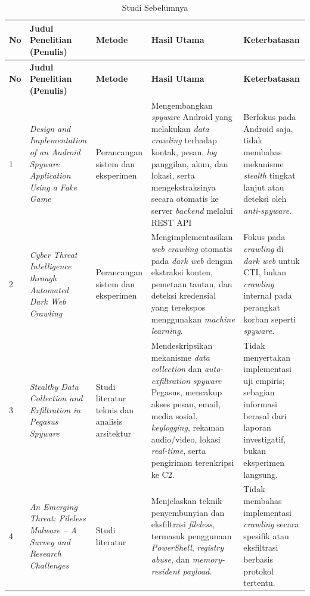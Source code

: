 \captionsetup{justification=raggedright,singlelinecheck=false}
\begin{longtable}{|p{0.5cm}|p{3cm}|p{2.3cm}|p{3.6cm}|p{3.6cm}|}
\caption{Studi Sebelumnya}
\label{tbl:studi-sebelumnya} \\
\hline
\textbf{No} &
\textbf{Judul Penelitian (Penulis)} &
\textbf{Metode} &
\textbf{Hasil Utama} &
\textbf{Keterbatasan} \\
\hline
\endfirsthead

\hline
\textbf{No} &
\textbf{Judul Penelitian (Penulis)} &
\textbf{Metode} &
\textbf{Hasil Utama} &
\textbf{Keterbatasan} \\
\hline
\endhead

\hline
\endfoot

1 &
\textit{Design and Implementation of an Android Spyware Application Using a Fake Game} \autocite{salih2020spyware} &
Perancangan sistem dan eksperimen &
Mengembangkan \textit{spyware} Android yang melakukan \textit{data crawling} terhadap kontak, pesan, \textit{log} panggilan, akun, dan lokasi, serta mengekstraksinya secara otomatis ke server \textit{backend} melalui REST API &
Berfokus pada Android saja, tidak membahas mekanisme \textit{stealth} tingkat lanjut atau deteksi oleh \textit{anti-spyware}. \\
\hline

2 &
\textit{Cyber Threat Intelligence through Automated Dark Web Crawling} \autocite{jegan2024aicrawler} &
Perancangan sistem dan eksperimen &
Mengimplementasikan \textit{web crawling} otomatis pada \textit{dark web} dengan ekstraksi konten, pemetaan tautan, dan deteksi kredensial yang terekspos menggunakan \textit{machine learning}. &
Fokus pada \textit{crawling} di \textit{dark web} untuk CTI, bukan \textit{crawling} internal pada perangkat korban seperti \textit{spyware}. \\
\hline

3 &
\textit{Stealthy Data Collection and Exfiltration in Pegasus Spyware} \autocite{kareem2024pegasus} &
Studi literatur teknis dan analisis arsitektur &
Mendeskripsikan mekanisme \textit{data collection} dan \textit{auto-exfiltration} \textit{spyware} Pegasus, mencakup akses pesan, email, media sosial, \textit{keylogging}, rekaman audio/video, lokasi \textit{real-time}, serta pengiriman terenkripsi ke C2. &
Tidak menyertakan implementasi uji empiris; sebagian informasi berasal dari laporan investigatif, bukan eksperimen langsung. \\
\hline

4 &
\textit{An Emerging Threat: Fileless Malware -- A Survey and Research Challenges} \autocite{sudhakar2020fileless} &
Studi literatur &
Menjelaskan teknik penyembunyian dan eksfiltrasi \textit{fileless}, termasuk penggunaan \textit{PowerShell}, \textit{registry abuse}, dan \textit{memory-resident payload}. &
Tidak membahas implementasi \textit{crawling} secara spesifik atau eksfiltrasi berbasis protokol tertentu. \\
\hline

\end{longtable}
